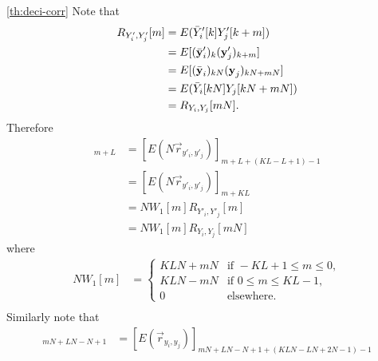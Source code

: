\documentclass[a4paper, openany, oneside]{memoir}
\begin{document}
\begin{blockProofTheorem}{\ref{th:deci-corr}}
    Note that
    \begin{align*}
        R_{Y'_i,Y'_j}[m]
        &= E(\bar{Y}'_i[k]Y'_j[k+m]) \\
        &= E[(\bar{\boldsymbol{\mathbf{y}}}'_i)_{k}(\boldsymbol{\mathbf{y}}'_j)_{k+m}] \\
        &= E[(\bar{\boldsymbol{\mathbf{y}}}_i)_{kN}(\boldsymbol{\mathbf{y}}_j)_{kN+mN}] \\
        &= E(\bar{Y}_i[kN]Y_j[kN+mN]) \\
        &= R_{Y_i,Y_j}[mN].
    \end{align*}
    Therefore
    \begin{align*}
        [E(N\hat{\vec{r}}_{y'_i,y'_j})]_{m+L}
        &= [E(N\vec{r}_{y'_i,y'_j})]_{m+L+(KL-L+1)-1} \\
        &= [E(N\vec{r}_{y'_i,y'_j})]_{m+KL} \\
        &= N W_1[m] R_{Y'_i,Y'_j}[m] \\
        &= N W_1[m] R_{Y_i,Y_j}[mN]
    \end{align*}
    where
    \begin{align*}
        NW_1[m] &= \begin{cases}
            KLN+mN & \text{if } -KL+1 \le m \le 0, \\
            KLN-mN & \text{if } 0 \le m \le KL - 1, \\
            0 & \text{elsewhere}.
        \end{cases} \\
    \end{align*}
    Similarly note that
    \begin{align*}
        [E(\hat{\vec{r}}_{y_i,y_j})]_{mN+LN-N+1} &= [E(\vec{r}_{y_i,y_j})]_{mN+LN-N+1 +(KLN-LN+2N-1) - 1} \\

\end{align*}
\end{blockProofTheorem}
\end{document}
